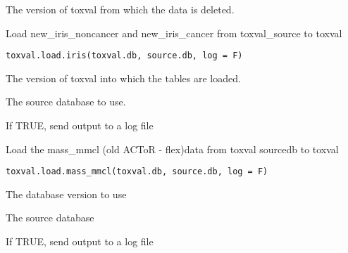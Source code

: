 \documentclass[letterpaper]{book}
\begin{document}
%
\begin{Arguments}
\begin{ldescription}
\item[\code{toxval.db}] The version of toxval from which the data is deleted.
\end{ldescription}
\end{Arguments}
%
\begin{Description}\relax
Load new\_iris\_noncancer and new\_iris\_cancer from toxval\_source to toxval
\end{Description}
%
\begin{Usage}
\begin{verbatim}
toxval.load.iris(toxval.db, source.db, log = F)
\end{verbatim}
\end{Usage}
%
\begin{Arguments}
\begin{ldescription}
\item[\code{toxval.db}] The version of toxval into which the tables are loaded.

\item[\code{source.db}] The source database to use.

\item[\code{log}] If TRUE, send output to a log file
\end{ldescription}
\end{Arguments}
%
\begin{Description}\relax
Load the mass\_mmcl (old ACToR - flex)data  from toxval sourcedb to toxval
\end{Description}
%
\begin{Usage}
\begin{verbatim}
toxval.load.mass_mmcl(toxval.db, source.db, log = F)
\end{verbatim}
\end{Usage}
%
\begin{Arguments}
\begin{ldescription}
\item[\code{toxval.db}] The database version to use

\item[\code{source.db}] The source database

\item[\code{log}] If TRUE, send output to a log file
\end{ldescription}
\end{Arguments}
\end{document}
